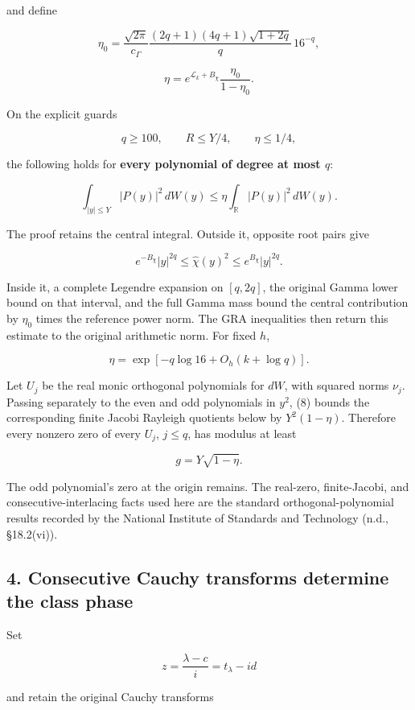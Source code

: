 and define

\[
\eta_0=
\frac{\sqrt{2\pi}}{c_\Gamma}
\frac{(2q+1)(4q+1)\sqrt{1+2q}}q\,16^{-q},
\]

\[
\eta=
e^{\mathscr L_k+B_\chi}
\frac{\eta_0}{1-\eta_0}.
\]

On the explicit guards

\[
q\ge100,\qquad R\le Y/4,\qquad \eta\le1/4,
\]

the following holds for \textbf{every polynomial of degree at most \(q\)}:

\[
\boxed{
\int_{|y|\le Y}|P(y)|^2\,dW(y)
\le
\eta\int_{\mathbb R}|P(y)|^2\,dW(y).
}
\tag{8}
\]

The proof retains the central integral. Outside it, opposite root pairs give

\[
e^{-B_\chi}|y|^{2q}
\le\widehat\chi(y)^2
\le e^{B_\chi}|y|^{2q}.
\]

Inside it, a complete Legendre expansion on \([q,2q]\), the original Gamma lower bound on that interval, and the full Gamma mass bound the central contribution by \(\eta_0\) times the reference power norm. The GRA inequalities then return this estimate to the original arithmetic norm. For fixed \(h\),

\[
\eta=\exp[-q\log16+O_h(k+\log q)].
\]

Let \(U_j\) be the real monic orthogonal polynomials for \(dW\), with squared norms \(\nu_j\). Passing separately to the even and odd polynomials in \(y^2\), (8) bounds the corresponding finite Jacobi Rayleigh quotients below by \(Y^2(1-\eta)\). Therefore every nonzero zero of every \(U_j\), \(j\le q\), has modulus at least

\[
g=Y\sqrt{1-\eta}.
\tag{9}
\]

The odd polynomial's zero at the origin remains. The real-zero, finite-Jacobi, and consecutive-interlacing facts used here are the standard orthogonal-polynomial results recorded by the National Institute of Standards and Technology (n.d., §18.2(vi)).

\subsection{4. Consecutive Cauchy transforms determine the class phase}\label{consecutive-cauchy-transforms-determine-the-class-phase}

Set

\[
z=\frac{\lambda-c}{i}=t_\lambda-id
\]

and retain the original Cauchy transforms

